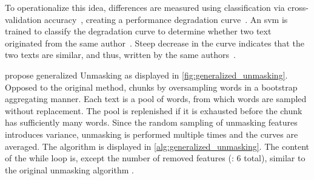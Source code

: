 To operationalize this idea, differences are measured using classification via cross-validation accuracy~\citep{koppel_authorship_2011,bevendorff_generalizing_2019,bevendorff_divergence_based_2020,potthast_stylometric_2018,koppel_authorship_2004}, 
creating a performance degradation curve~\citep{tyo_state_2022,koppel_authorship_2004}.
An \ac{svm} is trained to classify the degradation curve to determine whether two text originated from the same author~\citep{tyo_state_2022,bevendorff_generalizing_2019,koppel_authorship_2004}.
Steep decrease in the curve indicates that the two texts are similar, and thus, written by the same authors~\citep{potthast_stylometric_2018,koppel_authorship_2004}.

\citet{bevendorff_generalizing_2019,bevendorff_divergence_based_2020} propose generalized Unmasking as displayed in \autoref{fig:generalized_unmasking}.
Opposed to the original method, chunks by oversampling words in a bootstrap aggregating manner. 
Each text is a pool of words, from which words are sampled without replacement.
The pool is replenished if it is exhausted before the chunk has sufficiently many words.
Since the random sampling of unmasking features introduces variance, unmasking is performed multiple times and the curves are averaged.
The algorithm is displayed in \autoref{alg:generalized_unmasking}.
The content of the while loop is, except the number of removed features (\citep{koppel_authorship_2004}: 6 total), similar to the original unmasking algorithm \citep{koppel_authorship_2004}.


